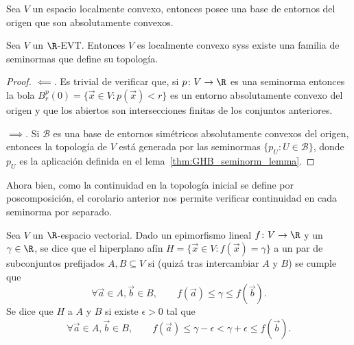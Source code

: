 \documentclass[topologia-analisis.tex]{subfiles}
\begin{document}
\begin{prop}
	Sea $V$ un espacio localmente convexo, entonces posee una base de entornos del origen que son absolutamente convexos.
\end{prop}
\begin{cor}
	Sea $V$ un $\R$-EVT.
	Entonces $V$ es localmente convexo syss existe una familia de seminormas que define su topología.
\end{cor}
\begin{proof}
	$\impliedby$.
	Es trivial de verificar que, si $p \colon V \to \R$ es una seminorma
	entonces la bola $B^p_r(0) = \{ \vec x \in V : p(\vec x) < r \}$ es un entorno absolutamente convexo del origen
	y que los abiertos son intersecciones finitas de los conjuntos anteriores.

	$\implies$.
	Si $\mathcal{B}$ es una base de entornos simétricos absolutamente convexos del origen,
	entonces la topología de $V$ está generada por las seminormas $\{ p_U : U \in \mathcal{B} \}$, donde $p_U$ es la aplicación definida en
	el lema~\ref{thm:GHB_seminorm_lemma}.
\end{proof}

Ahora bien, como la continuidad en la topología inicial se define por poscomposición,
el corolario anterior nos permite verificar continuidad en cada seminorma por separado.
\begin{mydef}
	Sea $V$ un $\R$-espacio vectorial.
	Dado un epimorfismo lineal $f \colon V \to \R$ y un $\gamma \in \R$,
	se dice que el hiperplano afín $H = \{ \vec x \in V : f(\vec x) = \gamma \}$  a un par de subconjuntos prefijados $A, B \subseteq V$
	si (quizá tras intercambiar $A$ y $B$) se cumple que
	\[
		\forall \vec a\in A, \vec b \in B, \qquad f(\vec a) \le \gamma \le f(\vec b).
	\]
	Se dice que $H$  a $A$ y $B$ si existe $\epsilon > 0$ tal que
	\[
		\forall \vec a\in A, \vec b \in B, \qquad f(\vec a) \le \gamma - \epsilon < \gamma + \epsilon \le f(\vec b).
	\]

\end{mydef}
\end{document}
